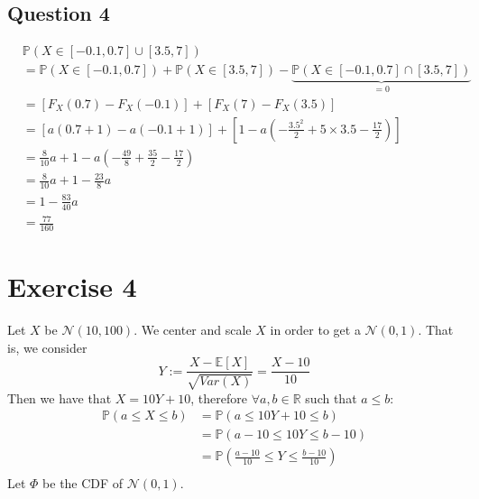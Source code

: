 \documentclass{article}
\renewcommand{\P}{\mathbb{P}}
\newcommand{\E}{\mathbb{E}}
\newcommand{\R}{\mathbb{R}}
\begin{document}
\subsection{Question 4}
\begin{align*}
     & \P (X \in [-0.1, 0.7] \cup [3.5, 7])                                                                                           \\
     & = \P (X \in [-0.1, 0.7]) + \P (X \in [3.5, 7]) - \underbrace{\P (X \in [-0.1, 0.7] \cap [3.5, 7])}_{=0}                        \\
     & = \left[ F_X(0.7) - F_X(-0.1) \right] + \left[ F_X(7) - F_X(3.5) \right]                                                       \\
     & = \left[ a(0.7 + 1) - a(-0.1 + 1) \right] + \left[ 1 - a \left( -\frac{3.5^2}{2} + 5 \times 3.5 - \frac{17}{2} \right) \right] \\
     & = \frac{8}{10}a + 1 - a \left( -\frac{49}{8} + \frac{35}{2} - \frac{17}{2} \right)                                             \\
     & = \frac{8}{10}a + 1 - \frac{23}{8}a                                                                                            \\
     & = 1 - \frac{83}{40}a                                                                                                           \\
     & = \frac{77}{160}
\end{align*}


\section{Exercise 4}
Let \(X\) be \(\mathcal{N}(10, 100)\). We center and scale \(X\) in order to get a \(\mathcal{N}(0,1)\). That is, we consider
\[
    Y := \frac{X - \E[X]}{\sqrt{Var(X)}} = \frac{X - 10}{10}
\]
Then we have that \(X = 10Y + 10\), therefore \(\forall a,b \in \R\) such that \(a \leq b\):
\begin{align*}
    \P(a \leq X \leq b)
     & =
    \P(a \leq 10Y + 10 \leq b)                          \\
     & =
    \P(a - 10 \leq 10Y \leq b - 10)                     \\
     & =
    \P(\frac{a - 10}{10} \leq Y \leq \frac{b - 10}{10}) \\
\end{align*}
Let \(\Phi\) be the CDF of \(\mathcal{N}(0,1)\).
\end{document}
